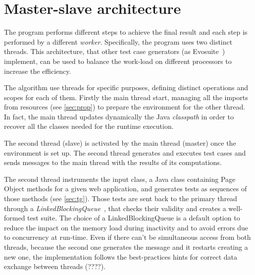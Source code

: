 \section{Master-slave architecture }\label{sec:MSArch}
The program performs different steps to achieve the final result and each step is performed by a different \textit{worker}. Specifically, the program uses two distinct threads. This architecture, that other test case generators (as Evosuite~\cite{evosuite}) implement, can be used to balance the work-load on different processors to increase the efficiency.
 

The algorithm use threads for specific purposes, defining distinct operations and scopes for each of them. Firstly the main thread start, managing all the imports from resources (see \autoref{sec:prop}) to prepare the environment for the other thread. In fact, the main thread updates dynamically the Java \textit{classpath} in order to recover all the classes needed for the runtime execution.

The second thread (slave) is activated by the main thread (master) once the environment is set up. The second thread generates and executes test cases and sends messages to the main thread with the results of its computations.

The second thread instruments the input class, a Java class containing Page Object methods for a given web application, and generates tests as sequences of those methods (see \autoref{sec:tg}). Those tests are sent back to the primary thread through a \textit{LinkedBlockingQueue}~\cite{linkedBlockingQueue}, that checks their validity and creates a well-formed test suite. The choice of a LinkedBlockingQueue is a default option to reduce the impact on the memory load during inactivity and to avoid errors due to concurrency at run-time. Even if there can't be simultaneous access from both threads, because the second one generates the message and it restarts creating a new one, the implementation follows the best-practices hints for correct data exchange between threads (????).